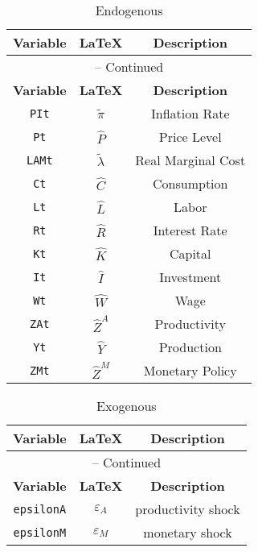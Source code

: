 \begin{center}
\begin{longtable}{ccc}
\caption{Endogenous}\\%
\hline%
\multicolumn{1}{c}{\textbf{Variable}} &
\multicolumn{1}{c}{\textbf{\LaTeX}} &
\multicolumn{1}{c}{\textbf{Description}}\\%
\hline\hline%
\endfirsthead
\multicolumn{3}{c}{{\tablename} \thetable{} -- Continued}\\%
\hline%
\multicolumn{1}{c}{\textbf{Variable}} &
\multicolumn{1}{c}{\textbf{\LaTeX}} &
\multicolumn{1}{c}{\textbf{Description}}\\%
\hline\hline%
\endhead
\texttt{PIt} & ${\tilde{\pi}}$ & Inflation Rate\\
\texttt{Pt} & ${\hat{P}}$ & Price Level\\
\texttt{LAMt} & ${\tilde{\lambda}}$ & Real Marginal Cost\\
\texttt{Ct} & ${\hat{C}}$ & Consumption\\
\texttt{Lt} & ${\hat{L}}$ & Labor\\
\texttt{Rt} & ${\hat{R}}$ & Interest Rate\\
\texttt{Kt} & ${\hat{K}}$ & Capital\\
\texttt{It} & ${\hat{I}}$ & Investment\\
\texttt{Wt} & ${\hat{W}}$ & Wage\\
\texttt{ZAt} & ${\hat{Z}^A}$ & Productivity\\
\texttt{Yt} & ${\hat{Y}}$ & Production\\
\texttt{ZMt} & ${\hat{Z}^M}$ & Monetary Policy\\
\hline%
\end{longtable}
\end{center}
\begin{center}
\begin{longtable}{ccc}
\caption{Exogenous}\\%
\hline%
\multicolumn{1}{c}{\textbf{Variable}} &
\multicolumn{1}{c}{\textbf{\LaTeX}} &
\multicolumn{1}{c}{\textbf{Description}}\\%
\hline\hline%
\endfirsthead
\multicolumn{3}{c}{{\tablename} \thetable{} -- Continued}\\%
\hline%
\multicolumn{1}{c}{\textbf{Variable}} &
\multicolumn{1}{c}{\textbf{\LaTeX}} &
\multicolumn{1}{c}{\textbf{Description}}\\%
\hline\hline%
\endhead
\texttt{epsilonA} & ${\varepsilon_A}$ & productivity shock\\
\texttt{epsilonM} & ${\varepsilon_M}$ & monetary shock\\
\hline%
\end{longtable}
\end{center}

